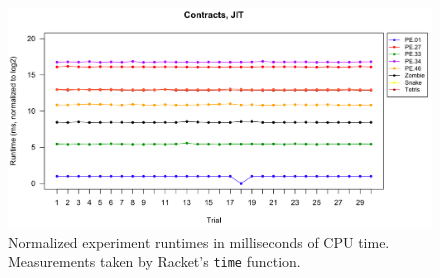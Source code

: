 \begin{figure}[t]
  \begin{center}
  \includegraphics[width=15cm]{data/contracts-jit-runtime.png}
  \caption{Normalized experiment runtimes in milliseconds of CPU time. ~~~~ Measurements taken by Racket's \texttt{time} function.}
  \label{fig:runtimes}
  \end{center}
\end{figure}
